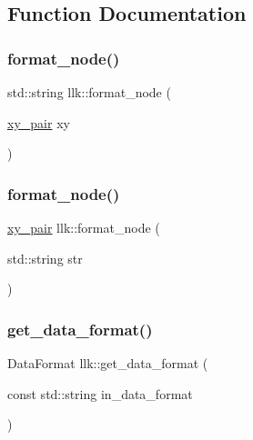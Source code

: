 \subsection{Function Documentation}
\mbox{\label{namespacellk_acc9374b9eb2016cc65e6efd3300a9480}} 
\subsubsection{\texorpdfstring{format\+\_\+node()}{format\_node()}\hspace{0.1cm}{\footnotesize\ttfamily [1/2]}}
{\footnotesize\ttfamily std\+::string llk\+::format\+\_\+node (\begin{DoxyParamCaption}\item[{\hyperlink{structllk_1_1xy__pair}{xy\+\_\+pair}}]{xy }\end{DoxyParamCaption})}

\mbox{\label{namespacellk_aa3ef0c59d3d30e3643a2bab665aa164c}} 
\subsubsection{\texorpdfstring{format\+\_\+node()}{format\_node()}\hspace{0.1cm}{\footnotesize\ttfamily [2/2]}}
{\footnotesize\ttfamily \hyperlink{structllk_1_1xy__pair}{xy\+\_\+pair} llk\+::format\+\_\+node (\begin{DoxyParamCaption}\item[{std\+::string}]{str }\end{DoxyParamCaption})}

\mbox{\label{namespacellk_a4d05986053a0ef31039cf648d9b673f9}} 
\subsubsection{\texorpdfstring{get\+\_\+data\+\_\+format()}{get\_data\_format()}}
{\footnotesize\ttfamily Data\+Format llk\+::get\+\_\+data\+\_\+format (\begin{DoxyParamCaption}\item[{const std\+::string}]{in\+\_\+data\+\_\+format }\end{DoxyParamCaption})}


